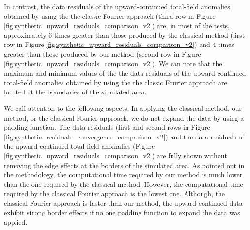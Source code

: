
In contrast, the data residuals of the upward-continued total-field anomalies obtained by using the 
the classic Fourier approach (third row in Figure \ref{fig:synthetic_upward_residuals_comparison_v2})
are, in most of the tests, approximately  $6$ times greater than those produced by the classical method 
(first  row in Figure \ref{fig:synthetic_upward_residuals_comparison_v2}) and $4$ times greater than those produced by our method (second row in Figure \ref{fig:synthetic_upward_residuals_comparison_v2}).
We can note that the maximum and minimum  values of the the data residuals of the upward-continued total-field anomalies obtained by using the the classic Fourier approach are located at the boundaries of the simulated area.

We call attention to the following aspects. 
In applying the classical method, our method, or the classical Fourier approach, we do not expand the data by using a padding function.
The data residuals (first and second rows in Figure \ref{fig:synthetic_residuals_convergence_comparison_v2})
and the data residuals of the upward-continued total-field anomalies 
(Figure \ref{fig:synthetic_upward_residuals_comparison_v2}) are fully shown  without removing the  edge effects at the borders of the simulated area. 
As pointed out in the methodology, the computational time required by our method is much lower than the one required by the classical method.
However, the computational time required by the classical Fourier approach is the lowest one.
Although, the classical Fourier approach is faster than our method, the upward-continued data exhibit strong border effects if no one padding function to expand the data was applied. 


